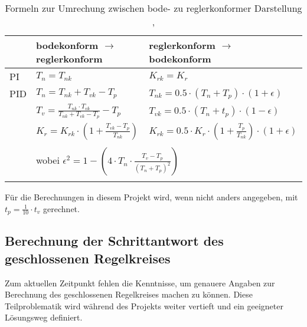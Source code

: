 \begin{longtable}{l|ll}
    \toprule


    &
    bodekonform $\rightarrow$ reglerkonform
    &
    reglerkonform $\rightarrow$ bodekonform
    \\

    \midrule

    \endhead
    \endfoot
    \endlastfoot


    PI
    &
    $T_n = T_{nk} $ %
    &
    $K_{rk} = K_r $ %
    \\

    \midrule

    PID
    &
    $T_n = T_{nk}+T_{vk}-T_p$
    &
    $T_{nk}=0.5 \cdot (T_n+T_p) \cdot (1+\epsilon)$
    \\

    &
    $T_v=\frac{T_{nk} \cdot T_{vk}}{T_{nk}+T_{vk}-T_p}-T_p$
    &
    $T_{vk}=0.5 \cdot (T_n+t_p) \cdot (1-\epsilon)$
    \\

    &
    $K_r=K_{rk} \cdot (1 + \frac{T_{vk}-T_p}{T_{nk}})$
    &
    $K_{rk} = 0.5 \cdot K_r \cdot (1 + \frac{T_p}{T_{nk}}) \cdot (1+\epsilon )$
    \\
    \\

    &
    \multicolumn{2}{l}{wobei $\epsilon^2 = 1-(4 \cdot T_n \cdot \frac{T_v-T_p}{(T_n+T_p)^2})$}
    \\
    \bottomrule
    \caption{Formeln zur Umrechung zwischen bode- zu reglerkonformer Darstellung \cite{regelungstechnik:zellweger}, \cite{regelungstechnik:schumleon}}
    \label{tab:bode_regler_konform}
\end{longtable}


F\"ur die Berechnungen in diesem Projekt wird, wenn nicht anders angegeben, mit $t_p=\frac{1}{10} \cdot t_v$ gerechnet.


\subsection{Berechnung der Schrittantwort des geschlossenen Regelkreises}

Zum   aktuellen  Zeitpunkt   fehlen  die   Kenntnisse,  um   genauere  Angaben
zur  Berechnung  des  geschlossenen  Regelkreises  machen  zu  k\"onnen. Diese
Teilproblematik wird w\"ahrend des Projekts weiter vertieft und ein geeigneter
L\"osungsweg definiert.
